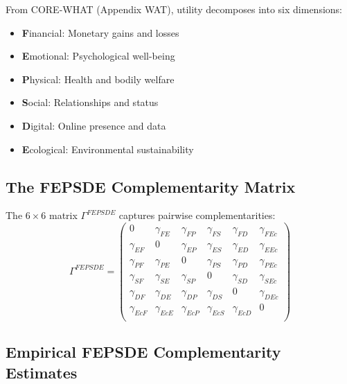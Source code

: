 From CORE-WHAT (Appendix WAT), utility decomposes into six dimensions:
\begin{itemize}[noitemsep]
    \item \textbf{F}inancial: Monetary gains and losses
    \item \textbf{E}motional: Psychological well-being
    \item \textbf{P}hysical: Health and bodily welfare
    \item \textbf{S}ocial: Relationships and status
    \item \textbf{D}igital: Online presence and data
    \item \textbf{E}cological: Environmental sustainability
\end{itemize}

\subsection{The FEPSDE Complementarity Matrix}

\begin{definition}
The $6 \times 6$ matrix $\Gamma^{FEPSDE}$ captures pairwise complementarities:
\begin{equation}
\Gamma^{FEPSDE} = \begin{pmatrix}
0 & \gamma_{FE} & \gamma_{FP} & \gamma_{FS} & \gamma_{FD} & \gamma_{FEc} \\
\gamma_{EF} & 0 & \gamma_{EP} & \gamma_{ES} & \gamma_{ED} & \gamma_{EEc} \\
\gamma_{PF} & \gamma_{PE} & 0 & \gamma_{PS} & \gamma_{PD} & \gamma_{PEc} \\
\gamma_{SF} & \gamma_{SE} & \gamma_{SP} & 0 & \gamma_{SD} & \gamma_{SEc} \\
\gamma_{DF} & \gamma_{DE} & \gamma_{DP} & \gamma_{DS} & 0 & \gamma_{DEc} \\
\gamma_{EcF} & \gamma_{EcE} & \gamma_{EcP} & \gamma_{EcS} & \gamma_{EcD} & 0 \\
\end{pmatrix}
\end{equation}
\end{definition}

\subsection{Empirical FEPSDE Complementarity Estimates}

